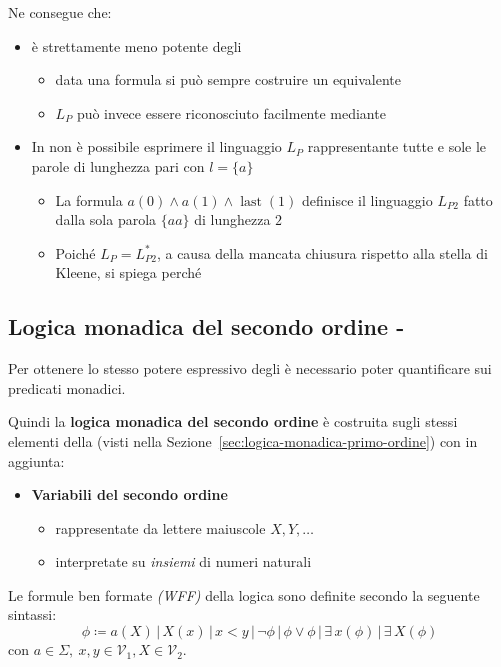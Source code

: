 \documentclass[italian, 10pt]{article}
\DeclareMathOperator{\lastop}{last}
\begin{document}
\bigskip
Ne consegue che:

\begin{itemize}
  \item \MFO è strettamente meno potente degli \FSA
        \begin{itemize}
          \item data una formula \MFO si può sempre costruire un \FSA equivalente
          \item \(L_P\) può invece essere riconosciuto facilmente mediante \FSA
        \end{itemize}
  \item In \MFO non è possibile esprimere il linguaggio \(L_P\) rappresentante tutte e sole le parole di lunghezza pari con \(l = \{ a \}\)
        \begin{itemize}
          \item La formula \MFO \(a(0) \land a(1) \land \lastop(1)\) definisce il linguaggio \(L_{P2}\) fatto dalla sola parola \(\{aa\}\) di lunghezza \(2\)
          \item Poiché \(L_P = L_{P2}^\ast\), a causa della mancata chiusura rispetto alla stella di Kleene, si spiega perché
        \end{itemize}
\end{itemize}

\subsection{Logica monadica del secondo ordine - \MSO}

Per ottenere lo stesso potere espressivo degli \FSA è necessario poter quantificare sui predicati monadici.

Quindi la \textbf{logica monadica del secondo ordine} è costruita sugli stessi elementi della \MFO (visti nella Sezione~\ref{sec:logica-monadica-primo-ordine}) con in aggiunta:

\begin{itemize}
  \item \textbf{Variabili del secondo ordine}
        \begin{itemize}
          \item rappresentate da lettere maiuscole \(X, Y, \ldots\)
          \item interpretate su \textit{insiemi} di numeri naturali
        \end{itemize}
\end{itemize}

Le formule ben formate \textit{(WFF)} della logica \MSO sono definite secondo la seguente sintassi:
\[ \phi \coloneqq a(X) \, | \, X(x) \, | \, x < y \, | \, \lnot \phi \, | \, \phi \lor \phi \, | \, \exists \, x (\phi) \, | \, \exists \, X (\phi) \]
con \(a \in \Sigma, \ x, y \in \mathcal{V}_1, X \in \mathcal{V}_2\).
\end{document}
